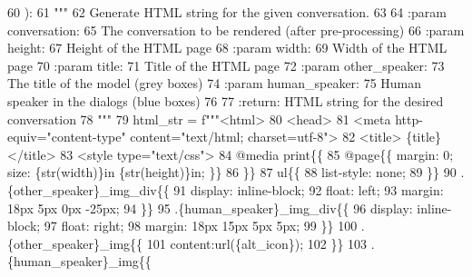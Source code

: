 \begin{DoxyCode}
60 ):
61     \textcolor{stringliteral}{"""}
62 \textcolor{stringliteral}{    Generate HTML string for the given conversation.}
63 \textcolor{stringliteral}{}
64 \textcolor{stringliteral}{    :param conversation:}
65 \textcolor{stringliteral}{        The conversation to be rendered (after pre-processing)}
66 \textcolor{stringliteral}{    :param height:}
67 \textcolor{stringliteral}{        Height of the HTML page}
68 \textcolor{stringliteral}{    :param width:}
69 \textcolor{stringliteral}{        Width of the HTML page}
70 \textcolor{stringliteral}{    :param title:}
71 \textcolor{stringliteral}{        Title of the HTML page}
72 \textcolor{stringliteral}{    :param other\_speaker:}
73 \textcolor{stringliteral}{        The title of the model (grey boxes)}
74 \textcolor{stringliteral}{    :param human\_speaker:}
75 \textcolor{stringliteral}{        Human speaker in the dialogs (blue boxes)}
76 \textcolor{stringliteral}{}
77 \textcolor{stringliteral}{    :return: HTML string for the desired conversation}
78 \textcolor{stringliteral}{    """}
79     html\_str = f\textcolor{stringliteral}{"""<html>}
80 \textcolor{stringliteral}{<head>}
81 \textcolor{stringliteral}{    <meta http-equiv="content-type" content="text/html; charset=utf-8">}
82 \textcolor{stringliteral}{    <title> \{title\} </title>}
83 \textcolor{stringliteral}{    <style type="text/css">}
84 \textcolor{stringliteral}{        @media print\{\{}
85 \textcolor{stringliteral}{            @page\{\{ margin: 0; size: \{str(width)\}in \{str(height)\}in; \}\}}
86 \textcolor{stringliteral}{        \}\}}
87 \textcolor{stringliteral}{        ul\{\{}
88 \textcolor{stringliteral}{          list-style: none;}
89 \textcolor{stringliteral}{        \}\}}
90 \textcolor{stringliteral}{        .\{other\_speaker\}\_img\_div\{\{}
91 \textcolor{stringliteral}{          display: inline-block;}
92 \textcolor{stringliteral}{          float: left;}
93 \textcolor{stringliteral}{          margin: 18px 5px 0px -25px;}
94 \textcolor{stringliteral}{        \}\}}
95 \textcolor{stringliteral}{        .\{human\_speaker\}\_img\_div\{\{}
96 \textcolor{stringliteral}{          display: inline-block;}
97 \textcolor{stringliteral}{          float: right;}
98 \textcolor{stringliteral}{          margin: 18px 15px 5px 5px;}
99 \textcolor{stringliteral}{        \}\}}
100 \textcolor{stringliteral}{        .\{other\_speaker\}\_img\{\{}
101 \textcolor{stringliteral}{            content:url(\{alt\_icon\});}
102 \textcolor{stringliteral}{        \}\}}
103 \textcolor{stringliteral}{        .\{human\_speaker\}\_img\{\{}

\end{DoxyCode}
